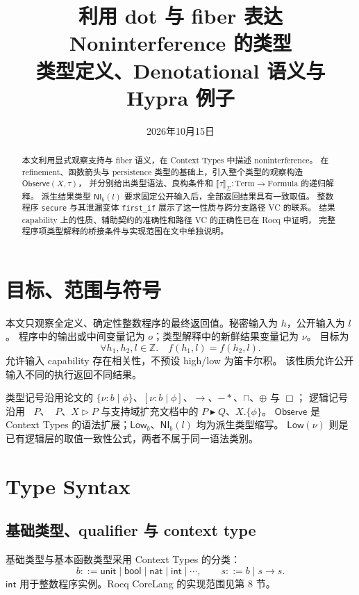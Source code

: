 \documentclass[UTF8,a4paper,11pt,fontset=fandol]{ctexart}
\title{利用 dot 与 fiber 表达 Noninterference 的类型\\\large 类型定义、Denotational 语义与 Hypra 例子}
\author{}
\date{2026年10月15日}
\newcommand{\omod}{\mathop{\boxed{\scriptstyle\mathrm{o}}}\nolimits}
\newcommand{\umod}{\mathop{\boxed{\scriptstyle\mathrm{u}}}\nolimits}
\newcommand{\oty}[2]{\{\nu:#1\mid #2\}}
\newcommand{\uty}[2]{[\nu:#1\mid #2]}
\newcommand{\Low}{\ensuremath{\mathsf{Low}}}
\newcommand{\Observe}{\ensuremath{\mathsf{Observe}}}
\newcommand{\Den}[1]{\llbracket #1\rrbracket}
\begin{document}
\maketitle
\begin{abstract}
本文利用显式观察支持与 fiber 语义，在 Context Types 中描述 noninterference。
在 refinement、函数箭头与 persistence 类型的基础上，引入整个类型的观察构造 $\Observe(X,\tau)$，
并分别给出类型语法、良构条件和 $\Den{\tau}_\Sigma:\mathrm{Term}\to\mathrm{Formula}$ 的递归解释。
派生结果类型 $\mathsf{NI}_b(l)$ 要求固定公开输入后，全部返回结果具有一致取值。
整数程序 \texttt{secure} 与其泄漏变体 \texttt{first\_if} 展示了这一性质与跨分支路径 VC 的联系。
结果 capability 上的性质、辅助契约的准确性和路径 VC 的正确性已在 Rocq 中证明，
完整程序项类型解释的桥接条件与实现范围在文中单独说明。
\end{abstract}

\section{目标、范围与符号}

本文只观察全定义、确定性整数程序的最终返回值。秘密输入为 $h$，公开输入为 $l$。
程序中的输出或中间变量记为 $o$；类型解释中的新鲜结果变量记为 $\nu$。
目标为
\begin{equation}\label{eq:pointni}
 \forall h_1,h_2,l\in\mathbb Z.\quad f(h_1,l)=f(h_2,l).
\end{equation}
允许输入 capability 存在相关性，不预设 high/low 为笛卡尔积。
该性质允许公开输入不同的执行返回不同结果。

类型记号沿用论文的 $\oty{b}{\phi}$、$\uty{b}{\phi}$、$\to$、$-\!\ast$、$\sqcap$、$\oplus$ 与 $\Box$；
逻辑记号沿用 $\omod P$、$\umod P$、$X\triangleright P$ 与支持域扩充文档中的 $P\blacktriangleright Q$、$X.\{\phi\}$。
$\Observe$ 是 Context Types 的语法扩展；$\mathsf{Low}_b$、$\mathsf{NI}_b(l)$ 均为派生类型缩写。
$\Low(\nu)$ 则是已有逻辑层的取值一致性公式，两者不属于同一语法类别。

\section{Type Syntax}

\subsection{基础类型、qualifier 与 context type}

基础类型与基本函数类型采用 Context Types 的分类\cite{context}：
\[
 b::=\mathsf{unit}\mid\mathsf{bool}\mid\mathsf{nat}\mid\mathsf{int}\mid\cdots,
 \qquad s::=b\mid s\to s.
\]
$\mathsf{int}$ 用于整数程序实例。Rocq CoreLang 的实现范围见第 8 节。
\end{document}
